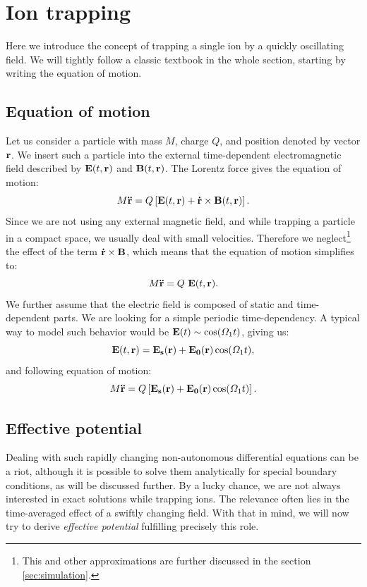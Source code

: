 \section{Ion trapping}
Here we introduce the concept of trapping a single ion by a quickly oscillating field. We will tightly follow a classic textbook \cite{gerlich1992inhomogeneous} in the whole section, starting by writing the equation of motion.

\subsection{Equation of motion}
Let us consider a particle with mass $M$, charge $Q$, and position denoted by vector $\vb{r}$. We insert such a particle into the external time-dependent electromagnetic field described by $\vb{E}(t,\vb{r})$ and $\vb{B}(t,\vb{r})$. The Lorentz force gives the equation of motion:
\begin{equation}
	M \vb{\ddot{r}} = Q \left[\vb{E}(t,\vb{r}) + \vb{\dot{r}} \times \vb{B}(t,\vb{r})\right].
\end{equation}
Since we are not using any external magnetic field, and while trapping a particle in a compact space, we usually deal with small velocities. Therefore we neglect\footnote{This and other approximations are further discussed in the section \ref{sec:simulation}.} the effect of the term $\vb{\dot{r}} \times \vb{B}$, which means that the equation of motion simplifies to:
\begin{equation}
	M \vb{\ddot{r}} = Q \ \vb{E}(t,\vb{r}).
\end{equation}
We further assume that the electric field is composed of static and time-dependent parts. We are looking for a simple periodic time-dependency. A typical way to model such behavior would be $\vb{E}(t) \sim \cos(\Omega_1 t)$, giving us:
\begin{equation}
	\vb{E}(t,\vb{r}) = \vb{E_s}(\vb{r}) + \vb{E_0}(\vb{r}) \cos(\Omega_1 t),
\end{equation}
and following equation of motion:
\begin{equation}
	\label{equation of motion}
	M \vb{\ddot{r}} = Q \left[ \vb{E_s}(\vb{r}) + \vb{E_0}(\vb{r}) \cos(\Omega_1 t) \right].
\end{equation}

\subsection{Effective potential}
Dealing with such rapidly changing non-autonomous differential equations can be a riot, although it is possible to solve them analytically for special boundary conditions, as will be discussed further. By a lucky chance, we are not always interested in exact solutions while trapping ions. The relevance often lies in the time-averaged effect of a swiftly changing field. With that in mind, we will now try to derive \emph{effective potential} fulfilling precisely this role.

